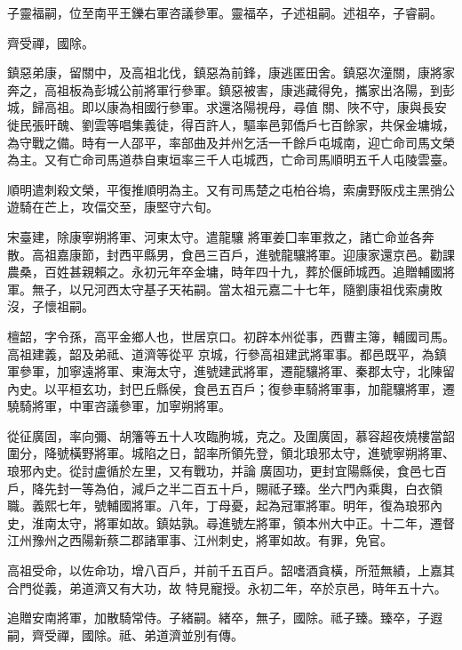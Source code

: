 \begin{pinyinscope}
 子靈福嗣，位至南平王鑠右軍咨議參軍。靈福卒，子述祖嗣。述祖卒，子睿嗣。



 齊受禪，國除。



 鎮惡弟康，留關中，及高祖北伐，鎮惡為前鋒，康逃匿田舍。鎮惡次潼關，康將家奔之，高祖板為彭城公前將軍行參軍。鎮惡被害，康逃藏得免，攜家出洛陽，到彭城，歸高祖。即以康為相國行參軍。求還洛陽視母，尋值
 關、陜不守，康與長安徙民張旰醜、劉雲等唱集義徒，得百許人，驅率邑郭僑戶七百餘家，共保金墉城，為守戰之備。時有一人邵平，率部曲及并州乞活一千餘戶屯城南，迎亡命司馬文榮為主。又有亡命司馬道恭自東垣率三千人屯城西，亡命司馬順明五千人屯陵雲臺。



 順明遣刺殺文榮，平復推順明為主。又有司馬楚之屯柏谷塢，索虜野阪戍主黑弰公遊騎在芒上，攻偪交至，康堅守六旬。



 宋臺建，除康寧朔將軍、河東太守。遣龍驤
 將軍姜囗率軍救之，諸亡命並各奔散。高祖嘉康節，封西平縣男，食邑三百戶，進號龍驤將軍。迎康家還京邑。勸課農桑，百姓甚親賴之。永初元年卒金墉，時年四十九，葬於偃師城西。追贈輔國將軍。無子，以兄河西太守基子天祐嗣。當太祖元嘉二十七年，隨劉康祖伐索虜敗沒，子懷祖嗣。



 檀韶，字令孫，高平金鄉人也，世居京口。初辟本州從事，西曹主簿，輔國司馬。高祖建義，韶及弟祗、道濟等從平
 京城，行參高祖建武將軍事。都邑既平，為鎮軍參軍，加寧遠將軍、東海太守，進號建武將軍，遷龍驤將軍、秦郡太守，北陳留內史。以平桓玄功，封巴丘縣侯，食邑五百戶；復參車騎將軍事，加龍驤將軍，遷驍騎將軍，中軍咨議參軍，加寧朔將軍。



 從征廣固，率向彌、胡籓等五十人攻臨朐城，克之。及圍廣固，慕容超夜燒樓當韶圍分，降號橫野將軍。城陷之日，韶率所領先登，領北琅邪太守，進號寧朔將軍、琅邪內史。從討盧循於左里，又有戰功，并論
 廣固功，更封宜陽縣侯，食邑七百戶，降先封一等為伯，減戶之半二百五十戶，賜祗子臻。坐六門內乘輿，白衣領職。義熙七年，號輔國將軍。八年，丁母憂，起為冠軍將軍。明年，復為琅邪內史，淮南太守，將軍如故。鎮姑孰。尋進號左將軍，領本州大中正。十二年，遷督江州豫州之西陽新蔡二郡諸軍事、江州刺史，將軍如故。有罪，免官。



 高祖受命，以佐命功，增八百戶，并前千五百戶。韶嗜酒貪橫，所蒞無績，上嘉其合門從義，弟道濟又有大功，故
 特見寵授。永初二年，卒於京邑，時年五十六。



 追贈安南將軍，加散騎常侍。子緒嗣。緒卒，無子，國除。祗子臻。臻卒，子遐嗣，齊受禪，國除。祗、弟道濟並別有傳。




\end{pinyinscope}
